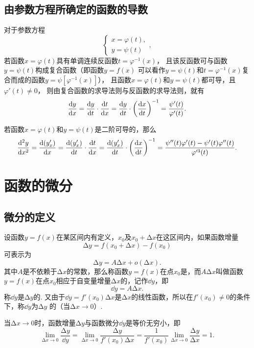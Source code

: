 \subsection{由参数方程所确定的函数的导数}
\begin{theorem}
对于参数方程\[
	\left\{ \begin{array}{l}
		x = \varphi(t), \\
		y = \psi(t)
	\end{array} \right.,
\]
若函数\(x = \varphi(t)\)具有单调连续反函数\(t=\varphi^{-1}(x)\)，
且该反函数可与函数\(y = \psi(t)\)构成复合函数（即函数\(y=f(x)\)
可以看作\(y=\psi(t)\)和\(t=\varphi^{-1}(x)\)复合而成的函数\(y=\psi[\varphi^{-1}(x)]\)），
且函数\(x = \varphi(t)\)和\(y = \psi(t)\)都可导，且\(\varphi'(t) \neq 0\)，
则由复合函数的求导法则与反函数的求导法则，就有\[
	\dv{y}{x} = \dv{y}{t} \cdot \dv{t}{x}
	= \dv{y}{t} \cdot \left(\dv{x}{t}\right)^{-1}
	= \frac{\psi'(t)}{\varphi'(t)}.
\]

若函数\(x = \varphi(t)\)和\(y = \psi(t)\)是二阶可导的，那么\[
	\dv[2]{y}{x}
	= \dv{(y'_x)}{x}
	= \dv{(y'_x)}{t} \cdot \dv{t}{x}
	= \dv{(y'_x)}{t} \cdot \left(\dv{x}{t}\right)^{-1}
	= \frac{\psi''(t) \varphi'(t) - \psi'(t) \varphi''(t)}{\varphi'^3(t)}.
\]
\end{theorem}

\section{函数的微分}
\subsection{微分的定义}
\begin{definition}
设函数\(y=f(x)\)在某区间内有定义，\(x_0\)及\(x_0+\increment x\)在这区间内，如果函数增量\[
\increment y=f(x_0+\increment x)-f(x_0)
\]可表示为\[
\increment y=A\increment x+o(\increment x).
\]其中\(A\)是不依赖于\(\increment x\)的常数，那么称函数\(y=f(x)\)在点\(x_0\)是，而\(A\increment x\)叫做函数\(y=f(x)\)在点\(x_0\)相应于自变量增量\(\increment x\)的，记作\(\dd{y}\)，即\[
\dd{y}=A\increment x.
\]称\(\dd{y}\)是\(\increment y\)的.
又由于\(\dd{y}=f'(x_0)\increment x\)是\(\increment x\)的线性函数，所以在\(f'(x_0) \neq 0\)的条件下，称\(\dd{y}\)为\(\increment y\) 的（当\(\increment x\to0\)）.
\end{definition}

\begin{property}
当\(\increment x\to0\)时，函数增量\(\increment y\)与函数微分\(\dd{y}\)是等价无穷小，即\[
\lim\limits_{\increment x\to0} \frac{\increment y}{\dd{y}}
= \lim\limits_{\increment x\to0} \frac{\increment y}{f'(x_0) \increment x}
= \frac{1}{f'(x_0)} \lim\limits_{\increment x\to0} \frac{\increment y}{\increment x}
= 1.
\]
\end{property}

